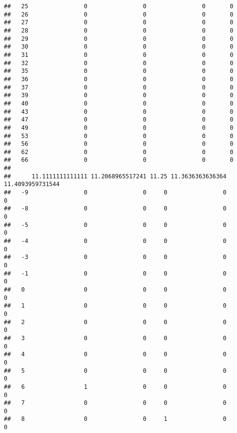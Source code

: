 \documentclass[]{article}
\begin{document}
\begin{verbatim}
##   25                0                0                0       0
##   26                0                0                0       0
##   27                0                0                0       0
##   28                0                0                0       0
##   29                0                0                0       0
##   30                0                0                0       0
##   31                0                0                0       0
##   32                0                0                0       0
##   35                0                0                0       0
##   36                0                0                0       0
##   37                0                0                0       0
##   39                0                0                0       0
##   40                0                0                0       0
##   43                0                0                0       0
##   47                0                0                0       0
##   49                0                0                0       0
##   53                0                0                0       0
##   56                0                0                0       0
##   62                0                0                0       0
##   66                0                0                0       0
##     
##      11.1111111111111 11.2068965517241 11.25 11.3636363636364 11.4093959731544
##   -9                0                0     0                0                0
##   -8                0                0     0                0                0
##   -5                0                0     0                0                0
##   -4                0                0     0                0                0
##   -3                0                0     0                0                0
##   -1                0                0     0                0                0
##   0                 0                0     0                0                0
##   1                 0                0     0                0                0
##   2                 0                0     0                0                0
##   3                 0                0     0                0                0
##   4                 0                0     0                0                0
##   5                 0                0     0                0                0
##   6                 1                0     0                0                0
##   7                 0                0     0                0                0
##   8                 0                0     1                0                0

\end{verbatim}
\end{document}

